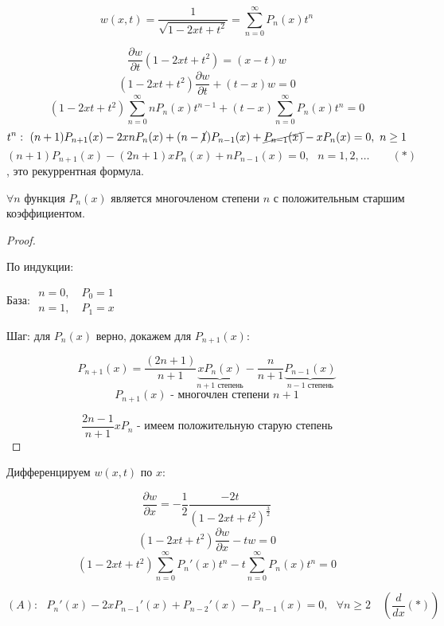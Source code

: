\documentclass[12pt, a4paper]{report}
\begin{document}
\fi


\[ w(x, t ) = \frac{1 }{\sqrt{1 - 2 xt + t ^2 }} = \sum_{n=0 }^{ \infty  } P_n (x ) t^n  \] 

\[ \frac{\partial  w }{\partial  t } (1 - 2x t +t ^2 ) = (x -t )w   \] 
\[ (1 - 2x t + t ^2 ) \frac{\partial  w }{\partial  t } + (t -x  ) w = 0  \] 
\[ (1 - 2xt + t ^2   ) \sum_{n =0 }^{\infty  } n P_n (x ) t^{ n -1 } + (t -x ) \sum_{n =0} ^{\infty  } P_n (x ) t^n =0   \] 
\[t^{n } : \text{ }   (n+1 ) P_{n+1 } (x )- 2 x nP_n(x ) + (n-\cancel{1} )P_{n-1 } ( x )+ \cancel{P_{n-1 } (x )} - x P_n( x )= 0 ,\text{ }  n \ge 1 \]  
\[ (n +1 )P_{n+1 } (x ) - (2 n +1 ) x P_n( x ) + n P_{n-1 } (x ) = 0 , \text{ } n =1,2, \ldots  \quad \quad (*)\] 
, это рекуррентная формула.

\begin{lemma}
    \( \forall  n  \) функция \( P_n(x ) \) является многочленом степени \( n \) с положительным старшим коэффициентом.
\end{lemma}

\begin{proof} \(  \) 

    По индукции: 

    База: \( \begin{aligned}
    n = 0 ,\quad  P_0 =1 \\ 
    n=1 ,\quad  P_1 =  x
    \end{aligned} \) 

    Шаг: для \( P_n(x ) \) верно, докажем для \( P_{n+1} (x) \): 

    \[ P_{n+1 } (x ) = \frac{(2 n +1 )}{n+1      } \underbrace{x P_n(x )}_{n+ 1 \text{ степень} } - \frac{n }{n+1 } \underbrace{P_{n-1 }  (x )}_{n-1 \text{ степень} }   \] 
    \[ P _{n+1 }  ( x) \text{  - многочлен степени }  n+ 1  \] 

    \[ \frac{2n -1 }{n+1 }x P_n \text{  - имеем положительную старую степень}   \] 
\end{proof}

Дифференцируем  \( w(x,t ) \) по \( x \): 

\[ \frac{\partial  w }{\partial  x } =  -\frac{1}{2}  \frac{- 2t  }{(1 - 2xt + t ^2 )^{\frac{3}{2} } }  \] 
\[ (1 - 2 xt +t ^2  ) \frac{\partial  w}{\partial  x } - t w = 0   \] 
\[ (1 - 2 xt  +t ^2  ) \sum_{n =0 }^{ \infty  } P_n ' (x ) t ^{ n }  - t \sum_{n =0 }^{\infty  } P_n(x ) t^n = 0  \] 

\[ (A) : \text{ }  P_n '(x ) -2 x P_{n-1 } ' (x ) + P_{n-2 } ' (x ) - P_{n-1 } (x ) =0 ,\text{ } \forall  n \ge 2 \quad \left( \frac{d }{dx }(*)  \right)  \] 
\end{document}
